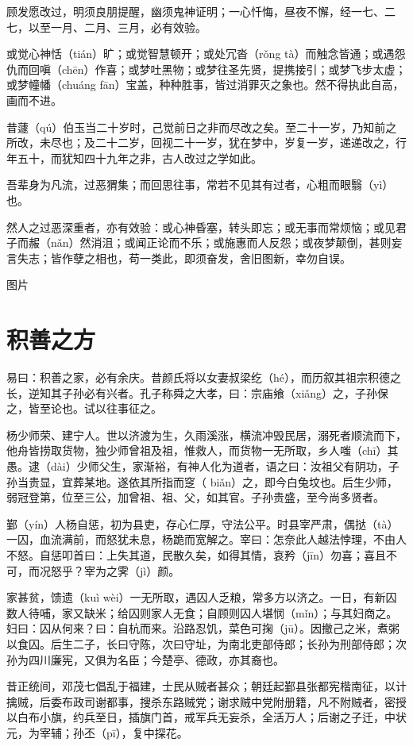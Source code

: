 \documentclass[12pt,UTF8]{ctexbook}
\begin{document}
顾发愿改过，明须良朋提醒，幽须鬼神证明；一心忏悔，昼夜不懈，经一七、二七，以至一月、二月、三月，必有效验。

或觉心神恬（tián）旷；或觉智慧顿开；或处冗沓（rǒng  tà）而触念皆通；或遇怨仇而回嗔（chēn）作喜；或梦吐黑物；或梦往圣先贤，提携接引；或梦飞步太虚；或梦幢幡（chuáng  fān）宝盖，种种胜事，皆过消罪灭之象也。然不得执此自高，画而不进。

昔蘧（qú）伯玉当二十岁时，己觉前日之非而尽改之矣。至二十一岁，乃知前之所改，未尽也；及二十二岁，回视二十一岁，犹在梦中，岁复一岁，递递改之，行年五十，而犹知四十九年之非，古人改过之学如此。

吾辈身为凡流，过恶猬集；而回思往事，常若不见其有过者，心粗而眼翳（yì）也。

然人之过恶深重者，亦有效验：或心神昏塞，转头即忘；或无事而常烦恼；或见君子而赧（nǎn）然消沮；或闻正论而不乐；或施惠而人反怨；或夜梦颠倒，甚则妄言失志；皆作孽之相也，苟一类此，即须奋发，舍旧图新，幸勿自误。

图片

\chapter{积善之方}

易曰：积善之家，必有余庆。昔颜氏将以女妻叔梁纥（hé），而历叙其祖宗积德之长，逆知其子孙必有兴者。孔子称舜之大孝，曰：宗庙飨（xiǎng）之，子孙保之，皆至论也。试以往事征之。

杨少师荣、建宁人。世以济渡为生，久雨溪涨，横流冲毁民居，溺死者顺流而下，他舟皆捞取货物，独少师曾祖及祖，惟救人，而货物一无所取，乡人嗤（chī）其愚。逮（dài）少师父生，家渐裕，有神人化为道者，语之曰：汝祖父有阴功，子孙当贵显，宜葬某地。遂依其所指而窆（ biǎn）之，即今白兔坟也。后生少师，弱冠登第，位至三公，加曾祖、祖、父，如其官。子孙贵盛，至今尚多贤者。

鄞（yín）人杨自惩，初为县吏，存心仁厚，守法公平。时县宰严肃，偶挞（tà）一囚，血流满前，而怒犹未息，杨跪而宽解之。宰曰：怎奈此人越法悖理，不由人不怒。自惩叩首曰：上失其道，民散久矣，如得其情，哀矜（jīn）勿喜；喜且不可，而况怒乎？宰为之霁（jì）颜。

家甚贫，馈遗（kuì  wèi）一无所取，遇囚人乏粮，常多方以济之。一日，有新囚数人待哺，家又缺米；给囚则家人无食；自顾则囚人堪悯（mǐn）；与其妇商之。妇曰：囚从何来？曰：自杭而来。沿路忍饥，菜色可掬（jū）。因撤己之米，煮粥以食囚。后生二子，长曰守陈，次曰守址，为南北吏部侍郎；长孙为刑部侍郎；次孙为四川廉宪，又俱为名臣；今楚亭、德政，亦其裔也。

昔正统间，邓茂七倡乱于福建，士民从贼者甚众；朝廷起鄞县张都宪楷南征，以计擒贼，后委布政司谢都事，搜杀东路贼党；谢求贼中党附册籍，凡不附贼者，密授以白布小旗，约兵至日，插旗门首，戒军兵无妄杀，全活万人；后谢之子迁，中状元，为宰辅；孙丕（pī），复中探花。
\end{document}
